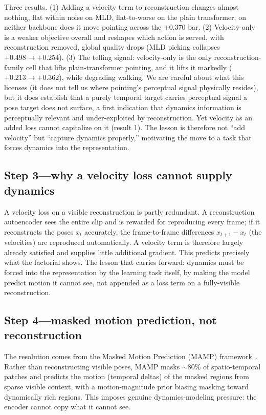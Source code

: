 \documentclass[letterpaper]{article} %
\begin{document}
Three results. {(1) Adding a velocity term to reconstruction changes almost nothing}, flat
within noise on MLD, flat-to-worse on the plain transformer; on neither backbone does it move
pointing across the $+0.370$ bar. {(2) Velocity-only is a weaker objective overall and
reshapes {which} action is served}, with reconstruction removed, global quality drops (MLD
picking collapses $+0.498 \to +0.254$). {(3) The telling signal:} velocity-only is the
only reconstruction-family cell that lifts plain-transformer pointing, and it lifts it markedly
($+0.213 \to +0.362$), while degrading walking. We are careful about what this licenses (it does
not tell us where pointing's perceptual signal physically resides), but it does establish that a
purely temporal target carries perceptual signal a pose target does not surface, a first
indication that {dynamics information is perceptually relevant} and under-exploited by
reconstruction. Yet velocity as an added {loss} cannot capitalize on it (result 1). The
lesson is therefore not ``add velocity'' but ``capture dynamics properly,'' motivating the move
to a task that {forces} dynamics into the representation.

\subsection{Step 3---why a velocity loss cannot supply dynamics}
A velocity loss on a visible reconstruction is {partly redundant}. A reconstruction
autoencoder sees the entire clip and is rewarded for reproducing every frame; if it reconstructs
the poses $x_t$ accurately, the frame-to-frame differences $x_{t+1}-x_t$ (the velocities) are
reproduced automatically. A velocity term is therefore largely already satisfied and supplies
little additional gradient. This predicts precisely what the factorial shows. The lesson that
carries forward: {dynamics must be forced into the representation by the learning task
itself}, by making the model {predict} motion it cannot see, not appended as a loss term
on a fully-visible reconstruction.

\subsection{Step 4---masked motion {prediction}, not reconstruction}
\label{sec:step4}
The resolution comes from the Masked Motion Prediction (MAMP) framework~\citep{mao2023mamp}.
Rather than reconstructing visible poses, MAMP {masks $\sim$80\% of spatio-temporal
patches and predicts the {motion} (temporal deltas) of the masked regions} from sparse
visible context, with a motion-magnitude prior biasing masking toward dynamically rich regions.
This imposes genuine dynamics-modeling pressure: the encoder cannot copy what it cannot see.
\end{document}
